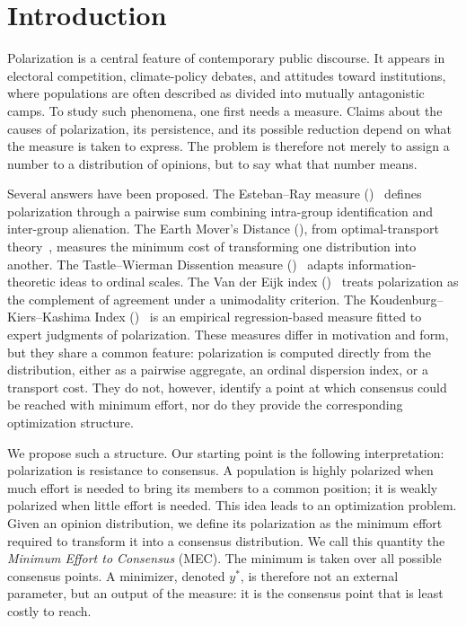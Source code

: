 \section{Introduction}

Polarization is a central feature of contemporary public discourse.
It appears in electoral competition, climate-policy debates, and
attitudes toward institutions, where populations are often described
as divided into mutually antagonistic camps. To study such phenomena,
one first needs a measure. Claims about the causes of polarization,
its persistence, and its possible reduction depend on what the measure
is taken to express. The problem is therefore not merely to assign a
number to a distribution of opinions, but to say what that number
means.

Several answers have been proposed. The Esteban--Ray measure
(\ERLabel)~\cite{esteban1994measurement} defines polarization
through a pairwise sum combining intra-group identification and
inter-group alienation. The Earth Mover's Distance
(\EMDLabel), from optimal-transport
theory~\cite{geher2020isometric,vallender1974calculation}, measures
the minimum cost of transforming one distribution into another.
The Tastle--Wierman Dissention measure
(\TWDLabel)~\cite{tastle2007consensus} adapts
information-theoretic ideas to ordinal scales. The Van der Eijk index
(\VdELabel)~\cite{van2001measuring} treats polarization as the
complement of agreement under a unimodality criterion. The
Koudenburg--Kiers--Kashima Index
(\KILabel)~\cite{koudenburg2021new} is an empirical
regression-based measure fitted to expert judgments of polarization.
These measures
differ in motivation and form, but they share a common feature:
polarization is computed directly from the distribution, either as a
pairwise aggregate, an ordinal dispersion index, or a transport cost.
They do not, however, identify a point at which consensus could be
reached with minimum effort, nor do they provide the corresponding
optimization structure.

We propose such a structure. Our starting point is the following
interpretation: polarization is resistance to consensus. A population
is highly polarized when much effort is needed to bring its members to
a common position; it is weakly polarized when little effort is needed.
This idea leads to an optimization problem. Given an opinion
distribution, we define its polarization as the minimum effort required
to transform it into a consensus distribution. We call this quantity
the \emph{Minimum Effort to Consensus} (MEC). The minimum is taken over
all possible consensus points. A minimizer, denoted \(y^*\), is
therefore not an external parameter, but an output of the measure: it
is the consensus point that is least costly to reach.

